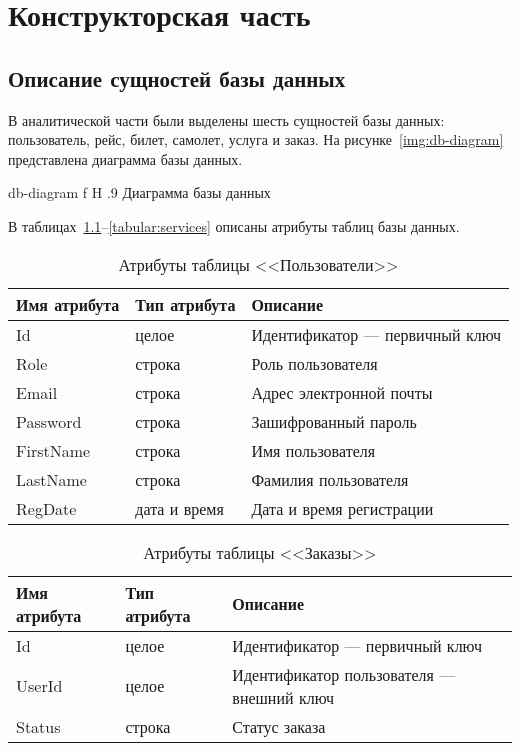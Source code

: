 \documentclass{bmstu}
\begin{document}
\chapter{Конструкторская часть}

\section{Описание сущностей базы данных}

В аналитической части были выделены шесть сущностей базы данных: пользователь, рейс, билет, самолет, услуга и заказ. 
На рисунке~\ref{img:db-diagram} представлена диаграмма базы данных.

    {db-diagram}
    {f}
    {H}
    {.9\textwidth}
    {Диаграмма базы данных}

В таблицах~\ref{tabular:users}--\ref{tabular:services} описаны атрибуты таблиц базы данных.

\begin{table}[H]
\caption{Атрибуты таблицы <<Пользователи>>}
\label{tabular:users}
\begin{tabular}{|>{\raggedleft}p{4cm}|>{\raggedleft}p{3cm}|>{\raggedleft}p{8cm}|}
\hline
\textbf{Имя атрибута} & \textbf{Тип атрибута} & \textbf{Описание}
\tabularnewline
\hline
Id & целое & Идентификатор --- первичный ключ
\tabularnewline
\hline
Role & строка & Роль пользователя
\tabularnewline
\hline
Email & строка & Адрес электронной почты
\tabularnewline
\hline
Password & строка & Зашифрованный пароль
\tabularnewline
\hline
FirstName & строка & Имя пользователя
\tabularnewline
\hline
LastName & строка & Фамилия пользователя
\tabularnewline
\hline
RegDate & дата и время & Дата и время регистрации
\tabularnewline
\hline
\end{tabular}
\end{table}

\begin{table}[H]
\caption{Атрибуты таблицы <<Заказы>>}
\label{tabular:orders}
\begin{tabular}{|>{\raggedleft}p{4cm}|>{\raggedleft}p{3cm}|>{\raggedleft}p{8cm}|}
\hline
\textbf{Имя атрибута} & \textbf{Тип атрибута} & \textbf{Описание}
\tabularnewline
\hline
Id & целое & Идентификатор --- первичный ключ
\tabularnewline
\hline
UserId & целое & Идентификатор пользователя --- внешний ключ
\tabularnewline
\hline
Status & строка & Статус заказа
\tabularnewline
\hline
\end{tabular}
\end{table}
\end{document}
